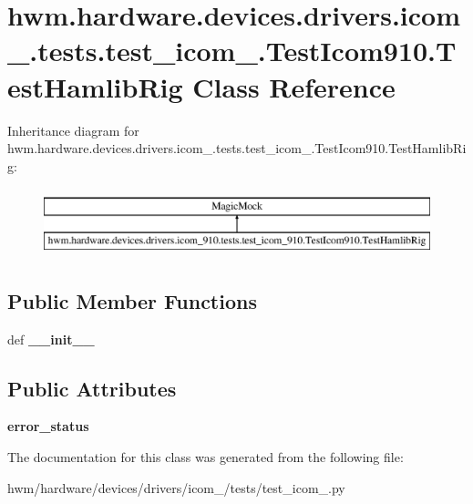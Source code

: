 \hypertarget{classhwm_1_1hardware_1_1devices_1_1drivers_1_1icom__910_1_1tests_1_1test__icom__910_1_1_test_icom910_1_1_test_hamlib_rig}{\section{hwm.\-hardware.\-devices.\-drivers.\-icom\-\_.\-tests.\-test\-\_\-icom\-\_.\-Test\-Icom910.\-Test\-Hamlib\-Rig Class Reference}
\label{classhwm_1_1hardware_1_1devices_1_1drivers_1_1icom__910_1_1tests_1_1test__icom__910_1_1_test_icom910_1_1_test_hamlib_rig}
}
Inheritance diagram for hwm.\-hardware.\-devices.\-drivers.\-icom\-\_.\-tests.\-test\-\_\-icom\-\_.\-Test\-Icom910.\-Test\-Hamlib\-Rig\-:\begin{figure}[H]
\begin{center}
\leavevmode
\includegraphics[height=2.000000cm]{classhwm_1_1hardware_1_1devices_1_1drivers_1_1icom__910_1_1tests_1_1test__icom__910_1_1_test_icom910_1_1_test_hamlib_rig}
\end{center}
\end{figure}
\subsection*{Public Member Functions}
\begin{DoxyCompactItemize}
\item 
\hypertarget{classhwm_1_1hardware_1_1devices_1_1drivers_1_1icom__910_1_1tests_1_1test__icom__910_1_1_test_icom910_1_1_test_hamlib_rig_af4609bc26a3220a16b2bca478b4756b5}{def {\bfseries \-\_\-\-\_\-init\-\_\-\-\_\-}}\label{classhwm_1_1hardware_1_1devices_1_1drivers_1_1icom__910_1_1tests_1_1test__icom__910_1_1_test_icom910_1_1_test_hamlib_rig_af4609bc26a3220a16b2bca478b4756b5}

\end{DoxyCompactItemize}
\subsection*{Public Attributes}
\begin{DoxyCompactItemize}
\item 
\hypertarget{classhwm_1_1hardware_1_1devices_1_1drivers_1_1icom__910_1_1tests_1_1test__icom__910_1_1_test_icom910_1_1_test_hamlib_rig_a39f0fecb2e1a6f117bbfaf3656dc0671}{{\bfseries error\-\_\-status}}\label{classhwm_1_1hardware_1_1devices_1_1drivers_1_1icom__910_1_1tests_1_1test__icom__910_1_1_test_icom910_1_1_test_hamlib_rig_a39f0fecb2e1a6f117bbfaf3656dc0671}

\end{DoxyCompactItemize}


The documentation for this class was generated from the following file\-:\begin{DoxyCompactItemize}
\item 
hwm/hardware/devices/drivers/icom\-\_/tests/test\-\_\-icom\-\_.\-py\end{DoxyCompactItemize}
